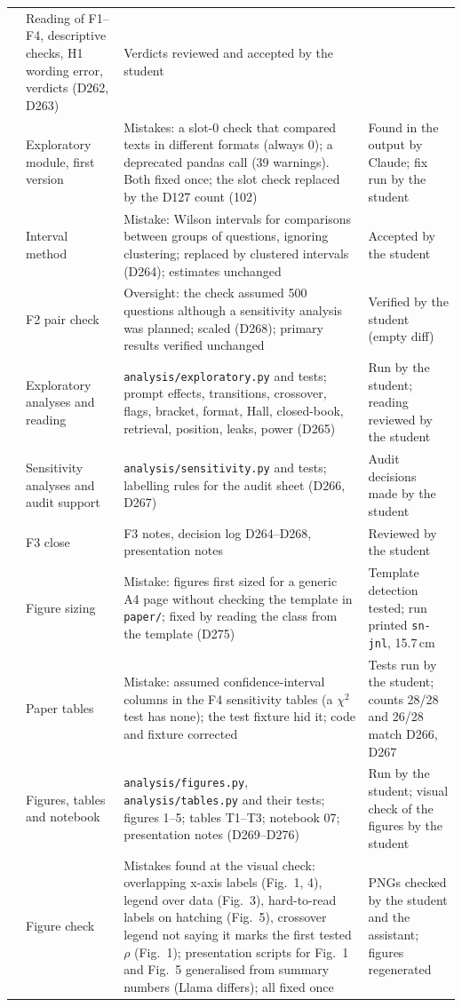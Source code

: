 \documentclass[11pt,a4paper]{report}
\begin{document}
{\begin{longtable}{
  >{\raggedright\arraybackslash}p{0.6cm}
  >{\raggedright\arraybackslash}p{4.4cm}
  >{\raggedright\arraybackslash}p{4.4cm}
  >{\raggedright\arraybackslash}p{4.8cm}}
  & Reading of F1--F4, descriptive checks, H1 wording error, verdicts (D262, D263)
  & Verdicts reviewed and accepted by the student \\
179 & Exploratory module, first version
  & Mistakes: a slot-0 check that compared texts in different formats (always 0); a deprecated pandas call (39 warnings). Both fixed once; the slot check replaced by the D127 count (102)
  & Found in the output by Claude; fix run by the student \\
180 & Interval method
  & Mistake: Wilson intervals for comparisons between groups of questions, ignoring clustering; replaced by clustered intervals (D264); estimates unchanged
  & Accepted by the student \\
181 & F2 pair check
  & Oversight: the check assumed 500 questions although a sensitivity analysis was planned; scaled (D268); primary results verified unchanged
  & Verified by the student (empty diff) \\
182 & Exploratory analyses and reading
  & \texttt{analysis/exploratory.py} and tests; prompt effects, transitions, crossover, flags, bracket, format, Hall, closed-book, retrieval, position, leaks, power (D265)
  & Run by the student; reading reviewed by the student \\
183 & Sensitivity analyses and audit support
  & \texttt{analysis/sensitivity.py} and tests; labelling rules for the audit sheet (D266, D267)
  & Audit decisions made by the student \\
184 & F3 close
  & F3 notes, decision log D264--D268, presentation notes
  & Reviewed by the student \\
  
185 & Figure sizing
  & Mistake: figures first sized for a generic A4 page without checking the template in \texttt{paper/}; fixed by reading the class from the template (D275)
  & Template detection tested; run printed \texttt{sn-jnl}, 15.7\,cm \\
186 & Paper tables
  & Mistake: assumed confidence-interval columns in the F4 sensitivity tables (a $\chi^2$ test has none); the test fixture hid it; code and fixture corrected
  & Tests run by the student; counts 28/28 and 26/28 match D266, D267 \\
187 & Figures, tables and notebook
  & \texttt{analysis/figures.py}, \texttt{analysis/tables.py} and their tests; figures 1--5; tables T1--T3; notebook 07; presentation notes (D269--D276)
  & Run by the student; visual check of the figures by the student \\
188 & Figure check
  & Mistakes found at the visual check: overlapping x-axis labels (Fig.~1, 4), legend over data (Fig.~3), hard-to-read labels on hatching (Fig.~5), crossover legend not saying it marks the first tested $\rho$ (Fig.~1); presentation scripts for Fig.~1 and Fig.~5 generalised from summary numbers (Llama differs); all fixed once
  & PNGs checked by the student and the assistant; figures regenerated \\


\end{longtable}}
\end{document}
